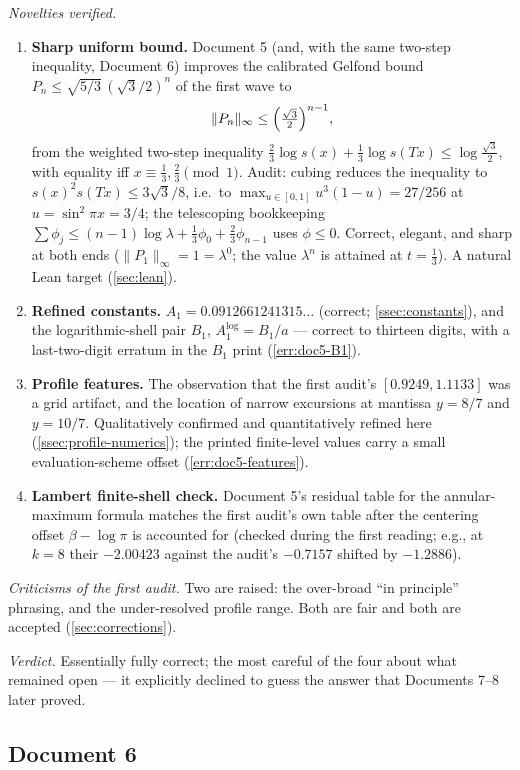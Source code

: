 \documentclass[11pt,oneside]{article}
\theoremstyle{definition}
\theoremstyle{remark}
\newcommand{\T}{T}
\begin{document}
\emph{Novelties verified.}
\begin{enumerate}
\item \textbf{Sharp uniform bound.}  Document 5 (and, with the same
two-step inequality, Document 6) improves the calibrated Gelfond bound
$P_n\le\sqrt{5/3}\,(\sqrt3/2)^n$ of the first wave to
\[
 \|P_n\|_\infty\le\Bigl(\tfrac{\sqrt3}2\Bigr)^{n-1},
\]
from the weighted two-step inequality
$\frac23\log s(x)+\frac13\log s(\T x)\le\log\frac{\sqrt3}2$, with
equality iff $x\equiv\frac13,\frac23\pmod1$.  Audit: cubing reduces the
inequality to $s(x)^2s(\T x)\le3\sqrt3/8$, i.e.\ to
$\max_{u\in[0,1]}u^3(1-u)=27/256$ at $u=\sin^2\pi x=3/4$; the
telescoping bookkeeping
$\sum\phi_j\le(n-1)\log\lambda+\frac13\phi_0+\frac23\phi_{n-1}$ uses
$\phi\le0$.  Correct, elegant, and sharp at both ends
($\|P_1\|_\infty=1=\lambda^0$; the value $\lambda^n$ is attained at
$t=\frac13$).  A natural Lean target (\cref{sec:lean}).
\item \textbf{Refined constants.}  $A_1=0.0912661241315\ldots$
(correct; \cref{ssec:constants}), and the logarithmic-shell pair
$B_1$, $A_1^{\log}=B_1/a$ --- correct to thirteen digits, with a
last-two-digit erratum in the $B_1$ print (\cref{err:doc5-B1}).
\item \textbf{Profile features.}  The observation that the first
audit's $[0.9249,1.1133]$ was a grid artifact, and the location of
narrow excursions at mantissa $y=8/7$ and $y=10/7$.  Qualitatively
confirmed and quantitatively refined here
(\cref{ssec:profile-numerics}); the printed finite-level values carry a
small evaluation-scheme offset (\cref{err:doc5-features}).
\item \textbf{Lambert finite-shell check.}  Document 5's residual table
for the annular-maximum formula matches the first audit's own table
after the centering offset $\beta-\log\pi$ is accounted for (checked
during the first reading; e.g., at $k=8$ their $-2.00423$ against the
audit's $-0.7157$ shifted by $-1.2886$).
\end{enumerate}

\emph{Criticisms of the first audit.}  Two are raised: the over-broad
``in principle'' phrasing, and the under-resolved profile range.  Both
are fair and both are accepted (\cref{sec:corrections}).

\emph{Verdict.}  Essentially fully correct; the most careful of the
four about what remained open --- it explicitly declined to guess the
answer that Documents 7--8 later proved.

\subsection{Document 6}
\label{ssec:doc6}
\end{document}
